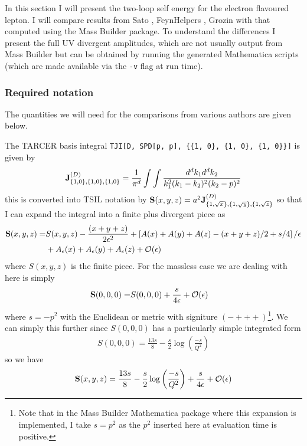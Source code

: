 \documentclass[11pt]{article}
\newcommand{\mb}{\textsf{Mass Builder} }
\begin{document}
In this section I will present the two-loop self energy for the electron flavoured lepton.  I will compare results from Sato \cite{Sato2013}, FeynHelpers \cite{Shtabovenko}, Grozin \cite{Grozin2005} with that computed using the \mb package.  To understand the differences I present the full UV divergent amplitudes, which are not usually output from \mb but can be obtained by running the generated Mathematica scripts (which are made available via the \lstinline{-v} flag at run time).\\

\subsubsection{Required notation}
The quantities we will need for the comparisons from various authors are given below.

The TARCER basis integral \lstinline|TJI[D, SPD[p, p], {{1, 0}, {1, 0}, {1, 0}}]| is given by \cite{Mertig1998}
\begin{align}
\bold{J}_{ \{1,0\}, \{1,0\}, \{1,0\}}^{(D)} = \frac{1}{\pi^d} \int\int \frac{ d^dk_1 d^dk_2}{k_1^2(k_1-k_2)^2(k_2-p)^2}
\end{align}
this is converted into TSIL notation by $\bold{S}(x,y,z) = a^2 \bold{J}_{ \{1,\sqrt{x}\}, \{1,\sqrt{y}\}, \{1,\sqrt{z}\}}^{(D)}$ so that I can expand the integral into a finite plus divergent piece as
\begin{align}
\begin{split}
\bold{S}(x,y,z)= &S(x,y,z) -\frac{(x+y+z)}{2\epsilon^2} + \left[A(x)+A(y)+A(z)-(x+y+z)/2+s/4\right]/\epsilon\\ &+ A_{\epsilon}(x)+ A_{\epsilon}(y)+ A_{\epsilon}(z)+\mathcal{O}(\epsilon)
\end{split}
\end{align}
where $S(x,y,z)$ is the finite piece. For the massless case we are dealing with here is simply
\begin{align}
\bold{S}(0,0,0)= &S(0,0,0) + \frac{s}{4\epsilon} + \mathcal{O}(\epsilon)
\end{align}
where $s=-p^2$ with the Euclidean or metric with signiture $(-+++)$\footnote{Note that in the \mb Mathematica package where this expansion is implemented, I take $s=p^2$ as the $p^2$ inserted here at evaluation time is positive.}.  We can simply this further since $S(0,0,0)$ has a particularly simple integrated form \cite{Martin2003}
\begin{align}
S(0,0,0) = \frac{13s}{8}-\frac{s}{2}\log\left(\frac{-s}{Q^2}\right)
\end{align}
so we have
\begin{align}
\bold{S}(x,y,z) =  \frac{13s}{8}-\frac{s}{2}\log\left(\frac{-s}{Q^2}\right) + \frac{s}{4\epsilon}   + \mathcal{O}(\epsilon) \label{eqn:J_expand}
\end{align}
\end{document}
